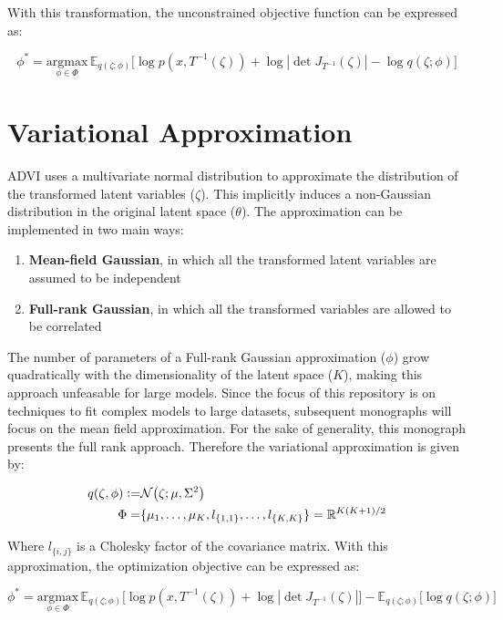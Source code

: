 \documentclass[10pt]{article}
\newcommand{\defeq}{\vcentcolon=}
\begin{document}
With this transformation, the unconstrained objective function can be expressed as:

\begin{equation*}
  \phi^* = \underset{\phi \in \Phi}{\text{argmax}} \, \mathbb{E}_{q(\zeta; \phi)}\big[\log p(x, T^{-1}(\zeta)) + \log |\det J_{T^{-1}}(\zeta)| - \log q(\zeta; \phi) \big]
\end{equation*}

\section*{Variational Approximation}

ADVI uses a multivariate normal distribution to approximate the distribution of the transformed latent variables ($\zeta$). This
implicitly induces a non-Gaussian distribution in the original latent space ($\theta$). The approximation can be implemented in
two main ways:

\begin{enumerate}
  \item \textbf{Mean-field Gaussian}, in which all the transformed latent variables are assumed to be independent
  \item \textbf{Full-rank Gaussian}, in which all the transformed variables are allowed to be correlated
\end{enumerate}

The number of parameters of a Full-rank Gaussian approximation ($\phi$) grow quadratically with the dimensionality of the 
latent space ($K$), making this approach unfeasable for large models. Since the focus of this repository is on techniques
to fit complex models to large datasets, subsequent monographs will focus on the mean field approximation. For the sake of 
generality, this monograph presents the full rank approach. Therefore the variational approximation is given by:

\begin{align*}
  q(\zeta, \phi) \defeq& \mathcal{N}\big(\zeta; \mu, \Sigma ^ 2\big) \\
  \Phi =& \{\mu_1, \ldots, \mu_K, l_{\{1, 1\}}, \ldots, l_{\{K, K\}} \} = \mathbb{R}^{K ( K + 1) / 2}
\end{align*}

Where $l_{\{i, j\}}$ is a Cholesky factor of the covariance matrix. With this approximation, the optimization objective 
can be expressed as:

\begin{equation*}
  \phi^* = \underset{\phi \in \Phi}{\text{argmax}} \, \mathbb{E}_{q(\zeta; \phi)}\big[\log p(x, T^{-1}(\zeta)) + \log |\det J_{T^{-1}}(\zeta)|\big] - \mathbb{E}_{q(\zeta; \phi)}\big[\log q(\zeta; \phi) \big]
\end{equation*}
\end{document}
